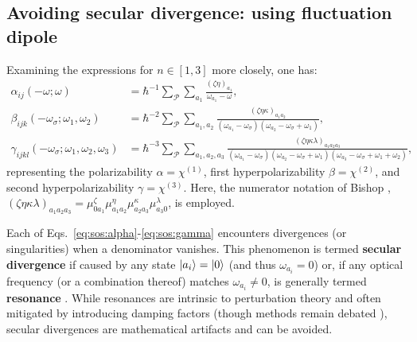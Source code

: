 \documentclass[12pt,a4paper]{article}
\begin{document}
\subsection{Avoiding secular divergence: using fluctuation dipole}

Examining the expressions for $n\in[1,3]$ more closely, one has:
\begin{align}
	\alpha_{ij}(-\omega;\omega) &= \hbar^{-1} \sum_\mathcal{P} \sum_{a_1} \frac{(\zeta\eta)_{a_1}}{\omega_{a_1} - \omega},\label{eq:sos:alpha}\\
	\beta_{ijk}(-\omega_\sigma; \omega_1, \omega_2) &= \hbar^{-2} \sum_\mathcal{P} \sum_{a_1,a_2} \frac{(\zeta\eta\kappa)_{a_1 a_2}}{(\omega_{a_1} - \omega_\sigma)(\omega_{a_2} - \omega_\sigma + \omega_1)},\label{eq:sos:beta}\\
	\gamma_{ijkl}(-\omega_\sigma; \omega_1, \omega_2, \omega_3) &= \hbar^{-3} \sum_\mathcal{P} \sum_{a_1, a_2, a_3} \frac{(\zeta\eta\kappa\lambda)_{a_1 a_2 a_3}}{(\omega_{a_1} - \omega_\sigma)(\omega_{a_2} - \omega_\sigma + \omega_1)(\omega_{a_3} - \omega_\sigma + \omega_1 + \omega_2)},\label{eq:sos:gamma}
\end{align}
representing the polarizability $\alpha = \chi^{(1)}$, first hyperpolarizability $\beta = \chi^{(2)}$, and second hyperpolarizability $\gamma = \chi^{(3)}$. Here, the numerator notation of Bishop \cite{bishopExplicitNondivergentFormulas1994}, $(\zeta\eta\kappa\lambda)_{a_1 a_2 a_3} = \mu_{0 a_1}^\zeta \mu_{a_1 a_2}^\eta \mu_{a_2 a_3}^\kappa \mu_{a_3 0}^\lambda$, is employed.

Each of Eqs.~\eqref{eq:sos:alpha}-\eqref{eq:sos:gamma} encounters divergences (or singularities) when a denominator vanishes. This phenomenon is termed \textbf{secular divergence} if caused by any state $\ket{a_i} = \ket{0}$ (and thus $\omega_{a_i} = 0$) or, if any optical frequency (or a combination thereof) matches $\omega_{a_i} \neq 0$, is generally termed \textbf{resonance} \cite{bishopExplicitNondivergentFormulas1994}. While resonances are intrinsic to perturbation theory and often mitigated by introducing damping factors (though methods remain debated \cite{campoPracticalModelFirst2012a}), secular divergences are mathematical artifacts and can be avoided. 
\end{document}
